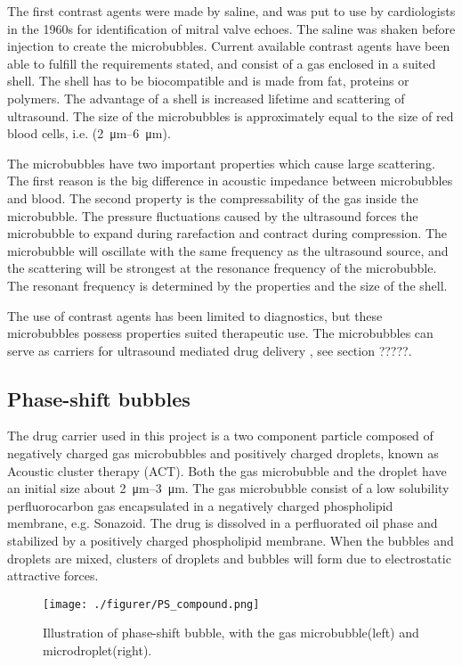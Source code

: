 The first contrast agents were made by saline, and was put to use by cardiologists in the 1960s for identification of mitral valve echoes. The saline was shaken before injection to create the microbubbles. Current available contrast agents have been able to fulfill the requirements stated, and consist of a gas enclosed in a suited shell. The shell has to be biocompatible and is made from fat, proteins or polymers. The advantage of a shell is increased lifetime and scattering of ultrasound. The size of the microbubbles is approximately equal to the size of red blood cells, i.e. (\SIrange{2}{6}{\micro\metre}).

The microbubbles have two important properties which cause large scattering. The first reason is the big difference in acoustic impedance between microbubbles and blood. The second property is the compressability of the gas inside the microbubble. The pressure fluctuations caused by the ultrasound forces the microbubble to expand during rarefaction and contract during compression. The microbubble will oscillate with the same frequency as the ultrasound source, and the scattering will be strongest at the resonance frequency of the microbubble. The resonant frequency is determined by the properties and the size of the shell.

The use of contrast agents has been limited to diagnostics, but these microbubbles possess properties suited therapeutic use. The microbubbles can serve as carriers for ultrasound mediated drug delivery \cite{Dijkmans2004}, see section ?????. 

\subsection{Phase-shift bubbles}
The drug carrier used in this project is a two component particle composed of negatively charged gas microbubbles and positively charged droplets, known as Acoustic cluster therapy (ACT). Both the gas microbubble and the droplet have an initial size about \SIrange{2}{3}{\micro\metre}. The gas microbubble consist of a low solubility perfluorocarbon gas encapsulated in a negatively charged phospholipid membrane, e.g. Sonazoid\texttrademark. The drug is dissolved in a perfluorated oil phase and stabilized by a positively charged phospholipid membrane. When the bubbles and droplets are mixed, clusters of droplets and bubbles will form due to electrostatic attractive forces.


\begin{figure}[h]
  \centering
  \label{Fig:Sonazoid}
  \texttt{[image: ./figurer/PS\_compound.png]}
  \caption{Illustration of phase-shift bubble, with the gas microbubble(left) and microdroplet(right).}
\end{figure}


